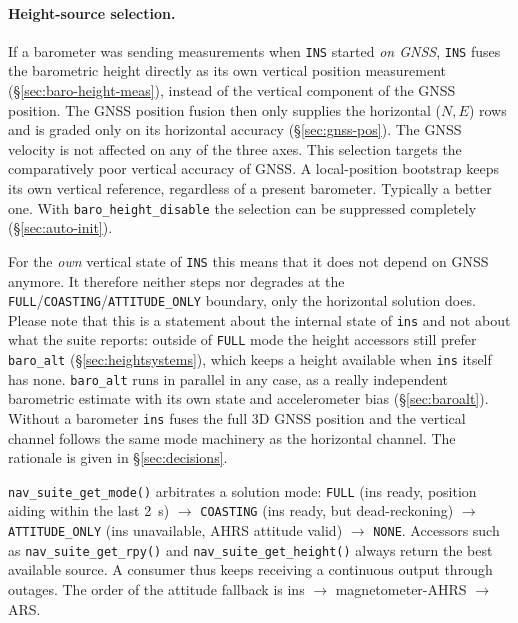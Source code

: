 \documentclass[11pt,a4paper]{article}
\newcommand{\code}[1]{\texttt{#1}}
\begin{document}
\paragraph{Height-source selection.} If a barometer was sending measurements
when \code{INS} started \emph{on GNSS}, \code{INS} fuses the barometric height
directly as its own vertical position measurement
(\S\ref{sec:baro-height-meas}), instead of the vertical component of the GNSS
position. The GNSS position fusion then only supplies the horizontal ($N,E$)
rows and is graded only on its horizontal accuracy (\S\ref{sec:gnss-pos}). The
GNSS velocity is not affected on any of the three axes. This selection targets
the comparatively poor vertical accuracy of GNSS. A local-position bootstrap
keeps its own vertical reference, regardless of a
present barometer. Typically a better one. With \code{baro\_\allowbreak{}height\_\allowbreak{}disable}
the selection can be suppressed completely (\S\ref{sec:auto-init}).

For the \emph{own} vertical state of \code{INS} this means that it does not
depend on GNSS anymore. It therefore neither steps nor degrades at the
\code{FULL}/\code{COASTING}/\code{ATTITUDE\_\allowbreak{}ONLY} boundary, only
the horizontal solution does. Please note that this is a statement about the
internal state of \code{ins} and not about what the suite reports: outside of
\code{FULL} mode the height accessors still prefer
\code{baro\_\allowbreak{}alt} (\S\ref{sec:heightsystems}), which keeps a height
available when \code{ins} itself has none. \code{baro\_\allowbreak{}alt} runs in
parallel in any case, as a really independent barometric estimate with its own
state and accelerometer bias (\S\ref{sec:baroalt}). Without a barometer
\code{ins} fuses the full 3D GNSS position and the vertical channel follows the
same mode machinery as the horizontal channel. The rationale is given in
\S\ref{sec:decisions}.

\code{nav\_\allowbreak{}suite\_\allowbreak{}get\_\allowbreak{}mode()}
arbitrates a solution mode: \code{FULL} (ins ready, position aiding within the
last \SI{2}{\second}) $\rightarrow$ \code{COASTING} (ins ready, but
dead-reckoning) $\rightarrow$ \code{ATTITUDE\_\allowbreak{}ONLY} (ins
unavailable, AHRS attitude valid) $\rightarrow$ \code{NONE}. Accessors such as
\code{nav\_\allowbreak{}suite\_\allowbreak{}get\_\allowbreak{}rpy()} and
\code{nav\_\allowbreak{}suite\_\allowbreak{}get\_\allowbreak{}height()} always
return the best available source. A consumer thus keeps receiving a continuous
output through outages. The order of the attitude fallback is ins
$\rightarrow$ magnetometer-AHRS $\rightarrow$ ARS.
\end{document}
